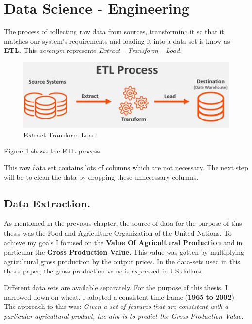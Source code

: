 \section{Data Science - Engineering}

The process of collecting raw data from sources, transforming it so that it matches our system's requirements and loading it into a data-set is know as \textbf{ETL.} This \textit{acronym} represents \textit{Extract - Transform - Load.}

\begin{figure}[h!]
	\includegraphics[width=\textwidth,height=\textheight,keepaspectratio]{fig/etl.jpg}
	\caption{Extract Transform Load.}
	\label{fig:ETL}
\end{figure}

Figure \ref{fig:ETL} shows the ETL process.


This raw data set contains lots of columns which are not necessary. The next step will be to clean the data by dropping these unnecessary columns. 


\subsection{Data Extraction.}

As mentioned in the previous chapter, the source of data for the purpose of this thesis was the Food and Agriculture Organization of the United Nations. To achieve my goals I focused on the \textbf{Value Of Agricultural Production} and in particular the \textbf{Gross Production Value.} This value was gotten by multiplying agricultural gross production by the output prices. In the data-sets used in this thesis paper, the gross production value is expressed in US dollars. 


Different data sets are available separately. For the purpose of this thesis, I narrowed down on wheat. I adopted a consistent time-frame (\textbf{1965 to 2002}). The approach to this was: \textit{Given a set of features that are consistent with a particular agricultural product, the aim is to predict the Gross Production Value.}

